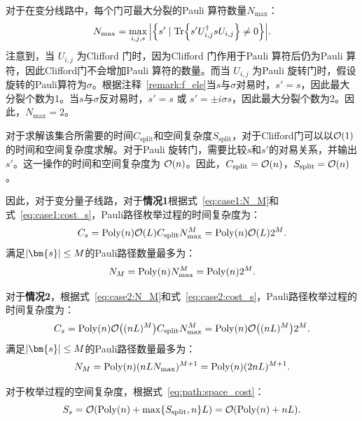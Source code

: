 对于在变分线路中，每个门可最大分裂的Pauli 算符数量$N_{\max}$：
\begin{equation}
    N_{\text{max}} = \max_{i,j,s}\abs{ \left\{ s'\mid \Tr{s' U^\dagger_{i,j}s U_{i,j}}\neq 0 \right\}}.
\end{equation}
注意到，当 $U_{i,j}$ 为Clifford 门时，因为Clifford 门作用于Pauli 算符后仍为Pauli 算符，因此Clifford门不会增加Pauli 算符的数量。而当 $U_{i,j}$ 为Pauli 旋转门时，假设旋转的Pauli算符为$\sigma$。根据注释~\ref{remark:f_ele}当$s$与$\sigma$对易时，$s'=s$，因此最大分裂个数为1。当$s$与$\sigma$反对易时，$s'=s$ 或 $s'=\pm i \sigma s$，因此最大分裂个数为2。因此，$N_{\text{max}}=2$。

对于求解该集合所需要的时间$C_{\text{split}}$和空间复杂度$S_{\text{split}}$，对于Clifford门可以以$\order{1}$的时间和空间复杂度求解。对于Pauli 旋转门，需要比较$s$和$s'$的对易关系，并输出$s'$。这一操作的时间和空间复杂度为 $\order{n}$。因此，$C_{\text{split}}=\order{n}$，$S_{\text{split}}=\order{n}$。

因此，对于变分量子线路，对于\textbf{情况1}根据式~\eqref{eq:case1:N_M}和式~\eqref{eq:case1:cost_s}，Pauli路径枚举过程的时间复杂度为：
\begin{equation}
    C_{s}=\mathrm{Poly}(n) \order{L} C_{\text{split}} N_{\text{max}}^{M}= \mathrm{Poly}(n) \order{L} 2^M.
\end{equation}
满足$\abs{\bm{s}}\leq M$的Pauli路径数量最多为：
\begin{equation}\label{eq:vqa:case1:N_M}
    N_M=\text{Poly}(n) N_{\text{max}}^{M}=\text{Poly}(n) 2^M.
\end{equation}

对于\textbf{情况2}，根据式~\eqref{eq:case2:N_M}和式~\eqref{eq:case2:cost_s}，Pauli路径枚举过程的时间复杂度为：
\begin{equation}
    C_{s}=\mathrm{Poly}(n) \order{(nL)^M} C_{\text{split}} N_{\text{max}}^{M}= \mathrm{Poly}(n) \order{(nL)^M} 2^M.
\end{equation}\label{eq:vqa:case2:N_M}
满足$\abs{\bm{s}}\leq M$的Pauli路径数量最多为：
\begin{equation}
    N_M=\text{Poly}(n)(nLN_{\text{max}})^{M+1}= \text{Poly}(n)(2nL)^{M+1}.
\end{equation}

对于枚举过程的空间复杂度，根据式~\eqref{eq:path:space_cost}：
\begin{equation}
    S_{s}=\order{\mathrm{Poly}(n)+\max\{S_{\text{split}},n\}L}=\order{\mathrm{Poly}(n)+nL}.
\end{equation}


